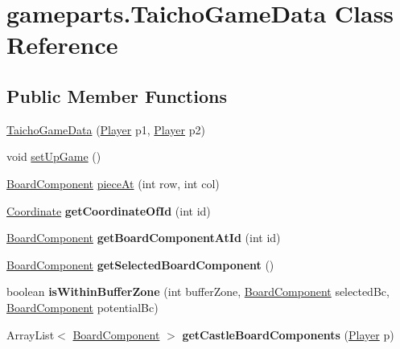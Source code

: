 \hypertarget{classgameparts_1_1_taicho_game_data}{\section{gameparts.\-Taicho\-Game\-Data Class Reference}
\label{classgameparts_1_1_taicho_game_data}
}
\subsection*{Public Member Functions}
\begin{DoxyCompactItemize}
\item 
\hyperlink{classgameparts_1_1_taicho_game_data_af29a8478a80dbf41b10b3bd93dd02014}{Taicho\-Game\-Data} (\hyperlink{enumenums_1_1_player}{Player} p1, \hyperlink{enumenums_1_1_player}{Player} p2)
\item 
void \hyperlink{classgameparts_1_1_taicho_game_data_affd00483be7a0c586f7ba812eeee20b2}{set\-Up\-Game} ()
\item 
\hyperlink{classbasecomponents_1_1_board_component}{Board\-Component} \hyperlink{classgameparts_1_1_taicho_game_data_a05658e9cf383afdb6f44f676ea7e5fbf}{piece\-At} (int row, int col)
\item 
\hypertarget{classgameparts_1_1_taicho_game_data_a8720dd08938b6fe530b411dde29d0a6c}{\hyperlink{classbasecomponents_1_1_coordinate}{Coordinate} {\bfseries get\-Coordinate\-Of\-Id} (int id)}\label{classgameparts_1_1_taicho_game_data_a8720dd08938b6fe530b411dde29d0a6c}

\item 
\hypertarget{classgameparts_1_1_taicho_game_data_a6ab803f168e0cb3562a5cb1ae67f2ef8}{\hyperlink{classbasecomponents_1_1_board_component}{Board\-Component} {\bfseries get\-Board\-Component\-At\-Id} (int id)}\label{classgameparts_1_1_taicho_game_data_a6ab803f168e0cb3562a5cb1ae67f2ef8}

\item 
\hypertarget{classgameparts_1_1_taicho_game_data_a7eff12889348e49fda984d7bdd9caed1}{\hyperlink{classbasecomponents_1_1_board_component}{Board\-Component} {\bfseries get\-Selected\-Board\-Component} ()}\label{classgameparts_1_1_taicho_game_data_a7eff12889348e49fda984d7bdd9caed1}

\item 
\hypertarget{classgameparts_1_1_taicho_game_data_a5bbf3bff0a5a7580f3134cf342b815e1}{boolean {\bfseries is\-Within\-Buffer\-Zone} (int buffer\-Zone, \hyperlink{classbasecomponents_1_1_board_component}{Board\-Component} selected\-Bc, \hyperlink{classbasecomponents_1_1_board_component}{Board\-Component} potential\-Bc)}\label{classgameparts_1_1_taicho_game_data_a5bbf3bff0a5a7580f3134cf342b815e1}

\item 
\hypertarget{classgameparts_1_1_taicho_game_data_acefb395f674430a1108927f4393b7e87}{Array\-List$<$ \hyperlink{classbasecomponents_1_1_board_component}{Board\-Component} $>$ {\bfseries get\-Castle\-Board\-Components} (\hyperlink{enumenums_1_1_player}{Player} p)}\label{classgameparts_1_1_taicho_game_data_acefb395f674430a1108927f4393b7e87}

\end{DoxyCompactItemize}


